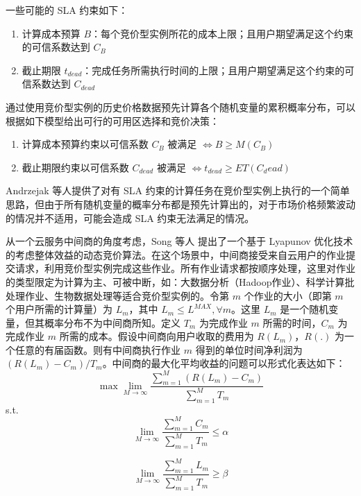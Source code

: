 一些可能的 SLA 约束如下：
\begin{enumerate}
\item 计算成本预算 $B$：每个竞价型实例所花的成本上限；且用户期望满足这个约束的可信系数达到 $C_B$
\item 截止期限 $t_{dead}$：完成任务所需执行时间的上限；且用户期望满足这个约束的可信系数达到 $C_{dead}$
\end{enumerate}

通过使用竞价型实例的历史价格数据预先计算各个随机变量的累积概率分布，可以根据如下模型给出可行的可用区选择和竞价决策：
\begin{enumerate}
\item 计算成本预算约束以可信系数 $C_B$ 被满足 $\iff B \geq M(C_B)$
\item 截止期限约束以可信系数 $C_{dead}$ 被满足 $\iff t_{dead} \geq ET(C_dead)$
\end{enumerate}

Andrzejak 等人提供了对有 SLA 约束的计算任务在竞价型实例上执行的一个简单思路，但由于所有随机变量的概率分布都是预先计算出的，对于市场价格频繁波动的情况并不适用，可能会造成 SLA 约束无法满足的情况。

从一个云服务中间商的角度考虑，Song 等人 \cite{song2012optimal} 提出了一个基于 Lyapunov 优化技术的考虑整体效益的动态竞价算法。在这个场景中，中间商接受来自云用户的作业提交请求，利用竞价型实例完成这些作业。所有作业请求都按顺序处理，这里对作业的类型限定为计算为主、可被中断，如：大数据分析（Hadoop作业）、科学计算批处理作业、生物数据处理等适合竞价型实例的。令第 $m$ 个作业的大小（即第 $m$ 个用户所需的计算量）为 $L_m$，其中 $L_m \leq L^{MAX}, \forall m$。这里 $L_m$ 是一个随机变量，但其概率分布不为中间商所知。定义 $T_m$ 为完成作业 $m$ 所需的时间，$C_m$ 为完成作业 $m$ 所需的成本。假设中间商向用户收取的费用为 $R(L_m)$，$R(.)$ 为一个任意的有届函数。则有中间商执行作业 $m$ 得到的单位时间净利润为 $(R(L_m) - C_m)/T_m$。中间商的最大化平均收益的问题可以形式化表达如下：
\begin{equation}\nonumber 
\max \lim_{M \rightarrow \infty}{\frac{\sum_{m=1}^M(R(L_m)-C_m)}{\sum_{m=1}^MT_m}}  
\end{equation}
s.t.
\begin{equation}\nonumber 
\lim_{M \rightarrow \infty}{\frac{\sum_{m=1}^MC_m}{\sum_{m=1}^MT_m}} \leq \alpha 
\end{equation}

\begin{equation}\nonumber 
\lim_{M \rightarrow \infty}{\frac{\sum_{m=1}^ML_m}{\sum_{m=1}^MT_m}} \geq \beta 
\end{equation}

